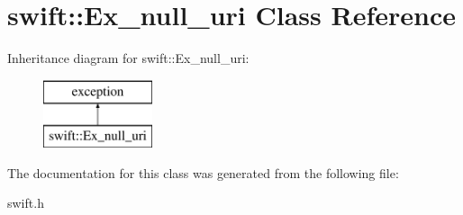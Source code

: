 \hypertarget{classswift_1_1_ex__null__uri}{\section{swift\-:\-:Ex\-\_\-null\-\_\-uri Class Reference}
\label{classswift_1_1_ex__null__uri}
}
Inheritance diagram for swift\-:\-:Ex\-\_\-null\-\_\-uri\-:\begin{figure}[H]
\begin{center}
\leavevmode
\includegraphics[height=2.000000cm]{classswift_1_1_ex__null__uri}
\end{center}
\end{figure}


The documentation for this class was generated from the following file\-:\begin{DoxyCompactItemize}
\item 
swift.\-h\end{DoxyCompactItemize}
